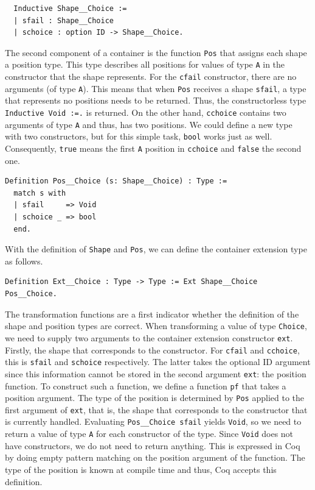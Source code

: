 \documentclass[a4paper, 11pt, fleqn, twoside]{scrreprt}
\newcommand{\hinl}[1]{\texttt{#1}}
\newcommand{\cinl}[1]{\texttt{#1}}
\begin{document}
\begin{verbatim}
  Inductive Shape__Choice :=
  | sfail : Shape__Choice
  | schoice : option ID -> Shape__Choice.
\end{verbatim}

The second component of a container is the function \cinl{Pos} that assigns each shape a position type.
This type describes all positions for values of type \cinl{A} in the constructor that the shape represents.
For the \cinl{cfail} constructor, there are no arguments (of type \cinl{A}).
This means that when \cinl{Pos} receives a shape \cinl{sfail}, a type that represents no positions needs to be returned.
Thus, the constructorless type \cinl{Inductive Void :=.} is returned.
On the other hand, \hinl{cchoice} contains two arguments of type \cinl{A} and thus, has two positions.
We could define a new type with two constructors, but for this simple task, \cinl{bool} works just as well.
Consequently, \cinl{true} means the first \cinl{A} position in \cinl{cchoice} and \cinl{false} the second one.

\begin{verbatim}
Definition Pos__Choice (s: Shape__Choice) : Type :=
  match s with
  | sfail     => Void
  | schoice _ => bool
  end.
\end{verbatim}

With the definition of \cinl{Shape} and \cinl{Pos}, we can define the container extension type as follows.

\begin{verbatim}
Definition Ext__Choice : Type -> Type := Ext Shape__Choice Pos__Choice.
\end{verbatim}

The transformation functions are a first indicator whether the definition of the shape and position types are correct.
When transforming a value of type \cinl{Choice}, we need to supply two arguments to the container extension constructor \cinl{ext}.
Firstly, the shape that corresponds to the constructor.
For \cinl{cfail} and \cinl{cchoice}, this is \cinl{sfail} and \cinl{schoice} respectively.
The latter takes the optional ID argument since this information cannot be stored in the second argument \cinl{ext}: the position function.
To construct such a function, we define a function \cinl{pf} that takes a position argument.
The type of the position is determined by \cinl{Pos} applied to the first argument of \cinl{ext}, that is, the shape that corresponds to the constructor that is currently handled.
Evaluating \cinl{Pos__Choice sfail} yields \cinl{Void}, so we need to return a value of type \cinl{A} for each constructor of the type.
Since \cinl{Void} does not have constructors, we do not need to return anything.
This is expressed in Coq by doing empty pattern matching on the position argument of the function.
The type of the position is known at compile time and thus, Coq accepts this definition.
\end{document}
